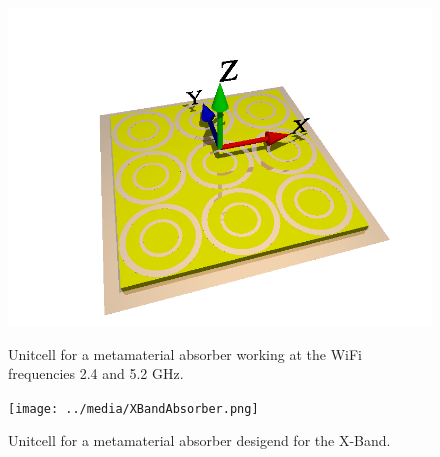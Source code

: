 \documentclass[a4paper,12pt]{scrartcl}  %
\begin{document}
\begin{figure}
\centering
\begin{minipage}[b]{0.5\textwidth}
\includegraphics[scale=0.3]{../media/double_rings.png}
\caption{Unitcell for a metamaterial absorber working at the WiFi frequencies 2.4 and 5.2 GHz.}
\label{fig:Wifi}
\hspace{55pt}
\end{minipage}
\begin{minipage}[b]{0.4\textwidth}
\texttt{[image: ../media/XBandAbsorber.png]}
\caption{Unitcell for a metamaterial absorber desigend for the X-Band.}
\label{fig:XBand}
\end{minipage}
\end{figure}




\newpage



\printbibliography
\end{document}
